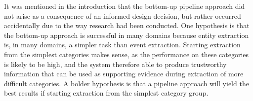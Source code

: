 It was mentioned in the introduction that the bottom-up pipeline approach did not arise as a consequence of an informed design decision, but rather occurred accidentally due to the way research had been conducted. One hypothesis is that the bottom-up approach is successful in many domains because entity extraction is, in many domains, a simpler task than event extraction. Starting extraction from the simplest categories makes sense, as the performance on these categories is likely to be high, and the system therefore able to produce trustworthy information that can be used as supporting evidence during extraction of more difficult categories. A bolder hypothesis is that a pipeline approach will yield the best results if starting extraction from the simplest category group.
